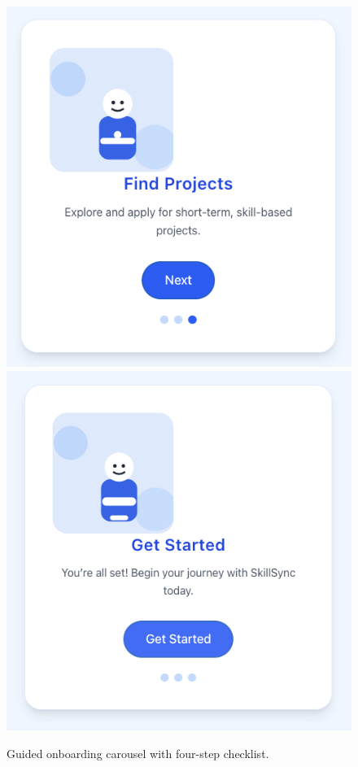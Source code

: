 \begin{figure}[H]
{\begin{minipage}[b]{0.42\textwidth}
    \end{minipage}\hspace{1.5em}%
    \begin{minipage}[b]{0.42\textwidth}
      \centering
      \includegraphics[width=\linewidth]{figures/Onboarding-3.png}\\[0.3em]
      \includegraphics[width=\linewidth]{figures/Onboarding-4.png}
    \end{minipage}}
  \caption{Guided onboarding carousel with four-step checklist.}
  \label{fig:onboarding-flow}
\end{figure}

